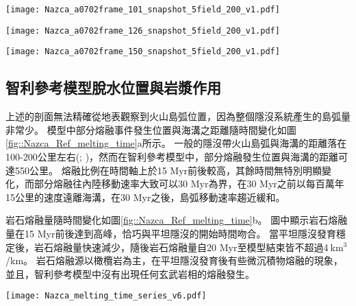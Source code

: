 \begin{figure*}[htp]
    \centering
    \texttt{[image: Nazca\_a0702frame\_101\_snapshot\_5field\_200\_v1.pdf]}
    \caption[智利參考模型於20 Myr時之結果]{智利參考模型於20 Myr時之結果。}
    \label{fig::Nazca_Ref_101}
\end{figure*}

\begin{figure*}[htp]
    \centering
    \texttt{[image: Nazca\_a0702frame\_126\_snapshot\_5field\_200\_v1.pdf]}
    \caption[智利參考模型於25 Myr時之結果]{智利參考模型於25 Myr時之結果。}
    \label{fig::Nazca_Ref_126}
\end{figure*}


\begin{figure*}[htp]
    \centering
    \texttt{[image: Nazca\_a0702frame\_150\_snapshot\_5field\_200\_v1.pdf]}
    \caption[智利參考模型於30 Myr時之結果]{智利參考模型於30 Myr時之結果。}
    \label{fig::Nazca_Ref_150}
\end{figure*}
\newpage
\subsection{智利參考模型脫水位置與岩漿作用}
上述的剖面無法精確從地表觀察到火山島弧位置，因為整個隱沒系統產生的島弧量非常少。
模型中部分熔融事件發生位置與海溝之距離隨時間變化如圖\ref{fig::Nazca_Ref_melting_time}a所示。
一般的隱沒帶火山島弧與海溝的距離落在100-200公里左右(\citealp{peacock1990fluid}; \citealp{hyndman2003serpentinization})，然而在智利參考模型中，部分熔融發生位置與海溝的距離可達550公里。
熔融比例在時間軸上於15 Myr前後較高，其餘時間無特別明顯變化，而部分熔融往內陸移動速率大致可以30 Myr為界，在30 Myr之前以每百萬年15公里的速度遠離海溝，在30 Myr之後，島弧移動速率趨近緩和。

岩石熔融量隨時間變化如圖\ref{fig::Nazca_Ref_melting_time}b。
圖中顯示岩石熔融量在15 Myr前後達到高峰，恰巧與平坦隱沒的開始時間吻合。
當平坦隱沒發育穩定後，岩石熔融量快速減少，隨後岩石熔融量自20 Myr至模型結束皆不超過4$\ $km$^3$/km。
岩石熔融源以橄欖岩為主，在平坦隱沒發育後有些微沉積物熔融的現象，並且，智利參考模型中沒有出現任何玄武岩相的熔融發生。

\begin{figure*}[h]
    \centering
    \texttt{[image: Nazca\_melting\_time\_series\_v6.pdf]}
    \caption[智利參考模型岩漿作用隨時間變化]{智利參考模型岩漿作用隨時間變化，灰色底標出平坦隱沒發育後時間段。(a)部分熔融與海溝之距離隨時間變化圖，縱軸中每個點代表每次部分熔融發生位置，顏色為指數上的部分熔融比例。(b)岩石熔融量隨時間變化圖，熔融量單位為每20萬年瞬時每單位海溝之立方公里量。顏色代表不同岩相。(c)岩漿庫體積與深度隨時間變化圖，岩漿庫單位為每單位海溝之立方公里量。顏色代表該時間中岩漿庫的平均所在深度。}
    \label{fig::Nazca_Ref_melting_time}
\end{figure*}

